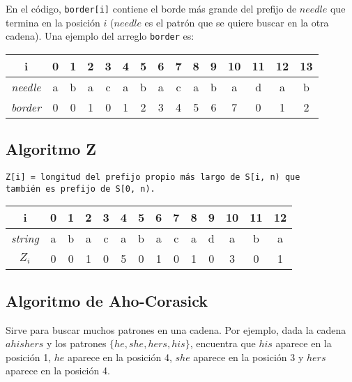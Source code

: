 \documentclass[10pt,letterpaper,twocolumn]{article}
\newcommand{\codigofuente}[1]{

\dotfill
}
\begin{document}
\smallskip

En el código, \verb_border[i]_ contiene el borde más grande del prefijo de $needle$ que termina en la posición $i$ ($needle$
es el patrón que se quiere buscar en la otra cadena). Una ejemplo del arreglo \verb_border_ es:

\begin{center}
  \begin{tabular}{| c | c c c c c c c c c c c c c c | }
    \hline
    i & 0 & 1 & 2 & 3 & 4 & 5 & 6 & 7 & 8 & 9 & 10 & 11 & 12 & 13 \\ [0.5ex]
    \hline
    \hline
    \textit{needle} & a & b & a & c & a & b & a & c & a & b & a & d & a & b \\
    \textit{border} & 0 & 0 & 1 & 0 & 1 & 2 & 3 & 4 & 5 & 6 & 7 & 0 & 1 & 2 \\
    \hline
  \end{tabular}
\end{center}



\codigofuente{./src/strings/kmp.cpp}

\subsection{Algoritmo Z}

\texttt{Z[i] = longitud del prefijo propio más largo de S[i, n) que \\
también es prefijo de S[0, n).}

\begin{center}
  \begin{tabular}{| c | c c c c c c c c c c c c c | }
    \hline
    i & 0 & 1 & 2 & 3 & 4 & 5 & 6 & 7 & 8 & 9 & 10 & 11 & 12 \\ [0.5ex]
    \hline
    \hline
    \textit{string} & a & b & a & c & a & b & a & c & a & d & a & b & a \\
    \textit{$Z_i$} & 0 & 0 & 1 & 0 & 5 & 0 & 1 & 0 & 1 & 0 & 3 & 0 & 1 \\
    \hline
  \end{tabular}
\end{center}


\codigofuente{./src/strings/z_algorithm.cpp}

\subsection{Algoritmo de Aho-Corasick}
Sirve para buscar muchos patrones en una cadena. Por ejemplo,
dada la cadena $ahishers$ y los patrones $\{he, she, hers, his\}$,
encuentra que $his$ aparece en la posición 1, $he$ aparece en la posición 4,
$she$ aparece en la posición 3 y $hers$ aparece en la posición 4.
\end{document}
